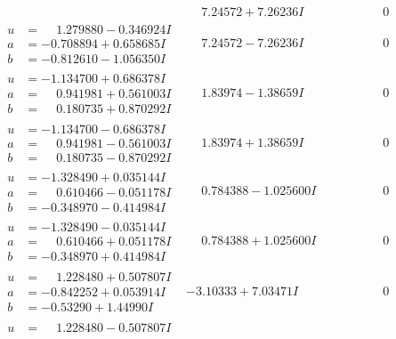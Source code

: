 \documentclass[1p]{elsarticle_modified}
\theoremstyle{definition}
\begin{document}
$$\begin{array}{c|c|c}
 & \phantom{-}7.24572 + 7.26236 I & \phantom{-0.000000 } 0 \\ \hline\begin{aligned}
u &= \phantom{-}1.279880 - 0.346924 I \\
a &= -0.708894 + 0.658685 I \\
b &= -0.812610 - 1.056350 I\end{aligned}
 & \phantom{-}7.24572 - 7.26236 I & \phantom{-0.000000 } 0 \\ \hline\begin{aligned}
u &= -1.134700 + 0.686378 I \\
a &= \phantom{-}0.941981 + 0.561003 I \\
b &= \phantom{-}0.180735 + 0.870292 I\end{aligned}
 & \phantom{-}1.83974 - 1.38659 I & \phantom{-0.000000 } 0 \\ \hline\begin{aligned}
u &= -1.134700 - 0.686378 I \\
a &= \phantom{-}0.941981 - 0.561003 I \\
b &= \phantom{-}0.180735 - 0.870292 I\end{aligned}
 & \phantom{-}1.83974 + 1.38659 I & \phantom{-0.000000 } 0 \\ \hline\begin{aligned}
u &= -1.328490 + 0.035144 I \\
a &= \phantom{-}0.610466 - 0.051178 I \\
b &= -0.348970 - 0.414984 I\end{aligned}
 & \phantom{-}0.784388 - 1.025600 I & \phantom{-0.000000 } 0 \\ \hline\begin{aligned}
u &= -1.328490 - 0.035144 I \\
a &= \phantom{-}0.610466 + 0.051178 I \\
b &= -0.348970 + 0.414984 I\end{aligned}
 & \phantom{-}0.784388 + 1.025600 I & \phantom{-0.000000 } 0 \\ \hline\begin{aligned}
u &= \phantom{-}1.228480 + 0.507807 I \\
a &= -0.842252 + 0.053914 I \\
b &= -0.53290 + 1.44990 I\end{aligned}
 & -3.10333 + 7.03471 I & \phantom{-0.000000 } 0 \\ \hline\begin{aligned}
u &= \phantom{-}1.228480 - 0.507807 I \\

\end{aligned}
\end{array}$$
\end{document}
